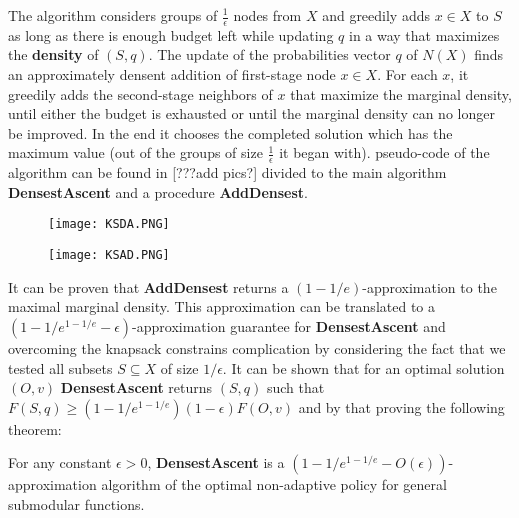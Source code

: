 The algorithm considers groups of $\frac{1}{\epsilon}$ nodes from $X$ and greedily adds $x \in X$ to $S$ as long as there is enough budget left while updating $q$ in a way that maximizes the \textbf{density} of $(S,q)$. The update of the probabilities vector $q$ of $N(X)$ finds an approximately densent addition of first-stage node $x \in X$.  For each $x$, it greedily adds the second-stage neighbors of $x$ that maximize the marginal density, until either the budget is exhausted or until the marginal density can no longer be improved.  In the end it chooses the completed solution which has the maximum value (out of the groups of size $\frac{1}{\epsilon}$ it began with). pseudo-code of the algorithm can be found in [???add pics?] divided to the main algorithm \textbf{DensestAscent} and a procedure \textbf{AddDensest}. 
\begin{figure}[h]
\texttt{[image: KSDA.PNG]}
\centering
\end{figure}
\begin{figure}[h]
\texttt{[image: KSAD.PNG]}
\centering
\end{figure}
It can be proven that \textbf{AddDensest} returns a $(1 - 1/e)$-approximation to the maximal marginal density. This approximation can be translated to a $(1 - 1/e^{1 - 1/e} - \epsilon)$-approximation guarantee for \textbf{DensestAscent} and overcoming the knapsack constrains complication by considering the fact that we tested all subsets $S \subseteq X$ of size $1/\epsilon$. It can be shown that for an optimal solution $(O, v)$ \textbf{DensestAscent} returns $(S, q)$ such that $F(S, q) \ge (1 − 1/e^{1−1/e})(1 − \epsilon)F(O, v)$ and by that proving the following theorem: 
\begin{theorem} For any constant $\epsilon > 0$, \textbf{DensestAscent} is a $(1 - 1/e^{1 - 1/e} - O(\epsilon))$-approximation algorithm of the optimal non-adaptive policy for general submodular functions.
\end{theorem}

